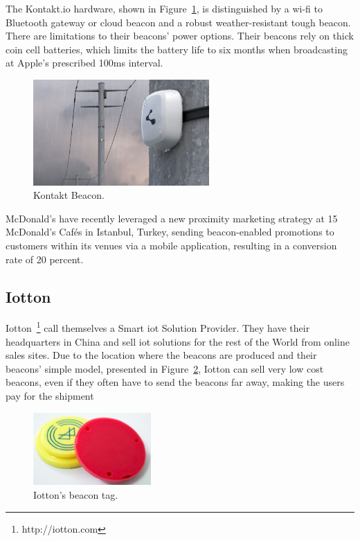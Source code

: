 The Kontakt.io hardware, shown in Figure~\ref{fig:kontaktbeacon}, is distinguished by a \gls{wi-fi} to Bluetooth gateway or cloud beacon and a robust weather-resistant tough beacon. There are limitations to their beacons’ power options. Their beacons rely on thick coin cell batteries, which limits the battery life to six months when broadcasting at Apple’s prescribed 100ms interval. 

\begin{figure}[!htb]
  \centering
  \includegraphics[width=0.6\textwidth]{Figures/kontakt_data.png}
  \caption[Kontakt Beacon]{Kontakt Beacon.}
  \label{fig:kontaktbeacon}
\end{figure}

McDonald’s have recently leveraged a new proximity marketing strategy at 15 McDonald's Cafés in Istanbul, Turkey, sending beacon-enabled promotions to customers within its venues via a mobile application, resulting in a conversion rate of 20 percent.

\subsection{Iotton} 
\label{subsection:iotton}
Iotton~\footnote{http://iotton.com} call themselves a Smart \gls{iot} Solution Provider. They have their headquarters in China and sell \gls{iot} solutions for the rest of the World from online sales sites.
Due to the location where the beacons are produced and their beacons' simple model, presented in Figure~\ref{fig:iottonbeacon}, Iotton can sell very low cost beacons, even if they often have to send the beacons far away, making the users pay for the shipment

\begin{figure}[!htb]
  \centering
  \includegraphics[width=0.4\textwidth]{Figures/iotton_data.png}
  \caption[Iotton's beacon tag]{Iotton's beacon tag.}
  \label{fig:iottonbeacon}
\end{figure}

